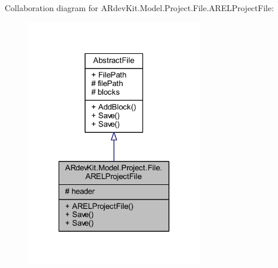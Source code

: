 Collaboration diagram for A\-Rdev\-Kit.\-Model.\-Project.\-File.\-A\-R\-E\-L\-Project\-File\-:
\nopagebreak
\begin{figure}[H]
\begin{center}
\leavevmode
\includegraphics[width=220pt]{class_a_rdev_kit_1_1_model_1_1_project_1_1_file_1_1_a_r_e_l_project_file__coll__graph}
\end{center}
\end{figure}
